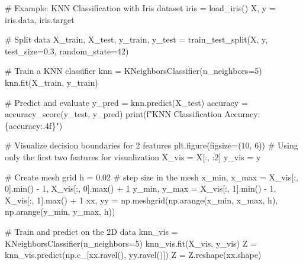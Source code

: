 \documentclass[
  letterpaper,
  DIV=11,
  numbers=noendperiod]{scrreprt}
\newenvironment{Shaded}{\begin{snugshade}}{\end{snugshade}}
\newcommand{\BuiltInTok}[1]{\textcolor[rgb]{0.00,0.23,0.31}{#1}}
\newcommand{\CommentTok}[1]{\textcolor[rgb]{0.37,0.37,0.37}{#1}}
\newcommand{\DecValTok}[1]{\textcolor[rgb]{0.68,0.00,0.00}{#1}}
\newcommand{\FloatTok}[1]{\textcolor[rgb]{0.68,0.00,0.00}{#1}}
\newcommand{\NormalTok}[1]{\textcolor[rgb]{0.00,0.23,0.31}{#1}}
\newcommand{\OperatorTok}[1]{\textcolor[rgb]{0.37,0.37,0.37}{#1}}
\newcommand{\SpecialCharTok}[1]{\textcolor[rgb]{0.37,0.37,0.37}{#1}}
\newcommand{\SpecialStringTok}[1]{\textcolor[rgb]{0.13,0.47,0.30}{#1}}
\begin{document}
\begin{Shaded}
\begin{Highlighting}[]
\CommentTok{\# Example: KNN Classification with Iris dataset}
\NormalTok{iris }\OperatorTok{=}\NormalTok{ load\_iris()}
\NormalTok{X, y }\OperatorTok{=}\NormalTok{ iris.data, iris.target}

\CommentTok{\# Split data}
\NormalTok{X\_train, X\_test, y\_train, y\_test }\OperatorTok{=}\NormalTok{ train\_test\_split(X, y, test\_size}\OperatorTok{=}\FloatTok{0.3}\NormalTok{, random\_state}\OperatorTok{=}\DecValTok{42}\NormalTok{)}

\CommentTok{\# Train a KNN classifier}
\NormalTok{knn }\OperatorTok{=}\NormalTok{ KNeighborsClassifier(n\_neighbors}\OperatorTok{=}\DecValTok{5}\NormalTok{)}
\NormalTok{knn.fit(X\_train, y\_train)}

\CommentTok{\# Predict and evaluate}
\NormalTok{y\_pred }\OperatorTok{=}\NormalTok{ knn.predict(X\_test)}
\NormalTok{accuracy }\OperatorTok{=}\NormalTok{ accuracy\_score(y\_test, y\_pred)}
\BuiltInTok{print}\NormalTok{(}\SpecialStringTok{f"KNN Classification Accuracy: }\SpecialCharTok{\{}\NormalTok{accuracy}\SpecialCharTok{:.4f\}}\SpecialStringTok{"}\NormalTok{)}

\CommentTok{\# Visualize decision boundaries for 2 features}
\NormalTok{plt.figure(figsize}\OperatorTok{=}\NormalTok{(}\DecValTok{10}\NormalTok{, }\DecValTok{6}\NormalTok{))}
\CommentTok{\# Using only the first two features for visualization}
\NormalTok{X\_vis }\OperatorTok{=}\NormalTok{ X[:, :}\DecValTok{2}\NormalTok{]}
\NormalTok{y\_vis }\OperatorTok{=}\NormalTok{ y}

\CommentTok{\# Create mesh grid}
\NormalTok{h }\OperatorTok{=} \FloatTok{0.02}  \CommentTok{\# step size in the mesh}
\NormalTok{x\_min, x\_max }\OperatorTok{=}\NormalTok{ X\_vis[:, }\DecValTok{0}\NormalTok{].}\BuiltInTok{min}\NormalTok{() }\OperatorTok{{-}} \DecValTok{1}\NormalTok{, X\_vis[:, }\DecValTok{0}\NormalTok{].}\BuiltInTok{max}\NormalTok{() }\OperatorTok{+} \DecValTok{1}
\NormalTok{y\_min, y\_max }\OperatorTok{=}\NormalTok{ X\_vis[:, }\DecValTok{1}\NormalTok{].}\BuiltInTok{min}\NormalTok{() }\OperatorTok{{-}} \DecValTok{1}\NormalTok{, X\_vis[:, }\DecValTok{1}\NormalTok{].}\BuiltInTok{max}\NormalTok{() }\OperatorTok{+} \DecValTok{1}
\NormalTok{xx, yy }\OperatorTok{=}\NormalTok{ np.meshgrid(np.arange(x\_min, x\_max, h), np.arange(y\_min, y\_max, h))}

\CommentTok{\# Train and predict on the 2D data}
\NormalTok{knn\_vis }\OperatorTok{=}\NormalTok{ KNeighborsClassifier(n\_neighbors}\OperatorTok{=}\DecValTok{5}\NormalTok{)}
\NormalTok{knn\_vis.fit(X\_vis, y\_vis)}
\NormalTok{Z }\OperatorTok{=}\NormalTok{ knn\_vis.predict(np.c\_[xx.ravel(), yy.ravel()])}
\NormalTok{Z }\OperatorTok{=}\NormalTok{ Z.reshape(xx.shape)}


\end{Highlighting}
\end{Shaded}
\end{document}
